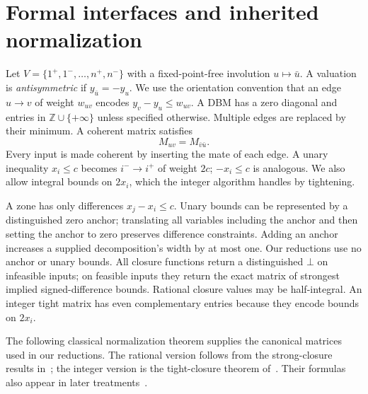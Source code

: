 \documentclass[manuscript,11pt,screen,nonacm]{acmart}
\theoremstyle{definition}
\newcommand{\Z}{\mathbb Z}
\begin{document}
\section{Formal interfaces and inherited normalization}\label{sec:formal}
Let $V=\{1^+,1^-,\ldots,n^+,n^-\}$ with a fixed-point-free involution $u\mapsto\bar u$. A valuation is \emph{antisymmetric} if $y_{\bar u}=-y_u$. We use the orientation convention that an edge $u\to v$ of weight $w_{uv}$ encodes $y_v-y_u\leq w_{uv}$. A DBM has a zero diagonal and entries in $\Z\cup\{+\infty\}$ unless specified otherwise. Multiple edges are replaced by their minimum. A coherent matrix satisfies
\begin{equation}\label{eq:coherent}
 M_{uv}=M_{\bar v\bar u}.
\end{equation}
Every input is made coherent by inserting the mate of each edge. A unary inequality $x_i\leq c$ becomes $i^-\to i^+$ of weight $2c$; $-x_i\leq c$ is analogous. We also allow integral bounds on $2x_i$, which the integer algorithm handles by tightening.

A zone has only differences $x_j-x_i\leq c$. Unary bounds can be represented by a distinguished zero anchor; translating all variables including the anchor and then setting the anchor to zero preserves difference constraints. Adding an anchor increases a supplied decomposition's width by at most one. Our reductions use no anchor or unary bounds. All closure functions return a distinguished $\bot$ on infeasible inputs; on feasible inputs they return the exact matrix of strongest implied signed-difference bounds. Rational closure values may be half-integral. An integer tight matrix has even complementary entries because they encode bounds on $2x_i$.

The following classical normalization theorem supplies the canonical matrices used in our reductions. The rational version follows from the strong-closure results in~\cite{bhz2009}; the integer version is the tight-closure theorem of~\cite{bhz2008}. Their formulas also appear in later treatments~\cite{crk2019,schwarz2023}.
\end{document}
